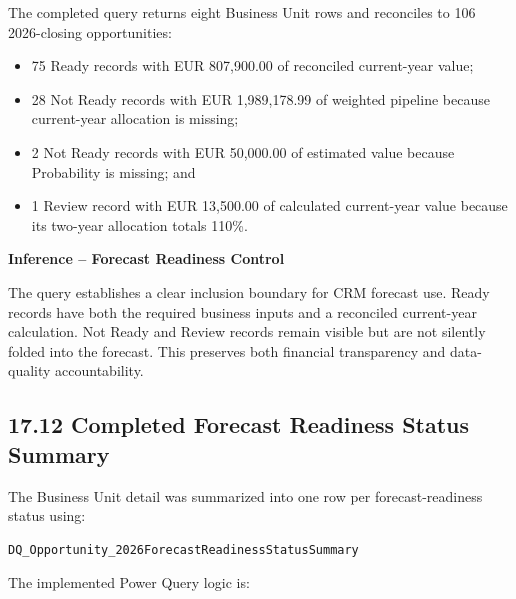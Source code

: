 \documentclass[11pt,a4paper]{article}
\begin{document}
The completed query returns eight Business Unit rows and reconciles to
106 2026-closing opportunities:

\begin{itemize}[leftmargin=7mm,itemsep=2pt]
    \item 75 Ready records with EUR 807,900.00 of reconciled current-year value;
    \item 28 Not Ready records with EUR 1,989,178.99 of weighted pipeline because
    current-year allocation is missing;
    \item 2 Not Ready records with EUR 50,000.00 of estimated value because
    Probability is missing; and
    \item 1 Review record with EUR 13,500.00 of calculated current-year value because
    its two-year allocation totals 110\%.
\end{itemize}

\begin{inferencebox}

\textbf{Inference -- Forecast Readiness Control}

The query establishes a clear inclusion boundary for CRM forecast use. Ready
records have both the required business inputs and a reconciled current-year
calculation. Not Ready and Review records remain visible but are not silently
folded into the forecast. This preserves both financial transparency and data-
quality accountability.

\end{inferencebox}

\subsection{17.12 Completed Forecast Readiness Status Summary}

The Business Unit detail was summarized into one row per forecast-readiness
status using:

\begin{lstlisting}[style=powerquery]
DQ_Opportunity_2026ForecastReadinessStatusSummary
\end{lstlisting}

The implemented Power Query logic is:
\end{document}
